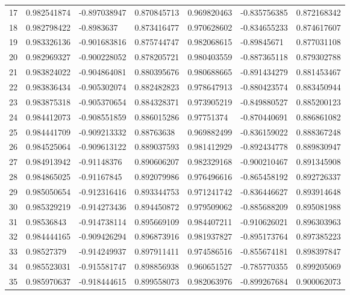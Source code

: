 \begin{table}[H]
{\begin{tabular}{@{}lllllll@{}}
        17 & 0.982541874 & -0.897038947 & 0.870845713 & 0.969820463 & -0.835756385 & 0.872168342 \\
        18 & 0.982798422 & -0.8983637 & 0.873416477 & 0.970628602 & -0.834655233 & 0.874617607 \\
        19 & 0.983326136 & -0.901683816 & 0.875744747 & 0.982068615 & -0.89845671 & 0.877031108 \\
        20 & 0.982969327 & -0.900228052 & 0.878205721 & 0.980403559 & -0.887365118 & 0.879302788 \\
        21 & 0.983824022 & -0.904864081 & 0.880395676 & 0.980688665 & -0.891434279 & 0.881453467 \\
        22 & 0.983836434 & -0.905302074 & 0.882482823 & 0.978647913 & -0.880423574 & 0.883450944 \\
        23 & 0.983875318 & -0.905370654 & 0.884328371 & 0.973905219 & -0.849880527 & 0.885200123 \\
        24 & 0.984412073 & -0.908551859 & 0.886015286 & 0.97751374 & -0.870440691 & 0.886861082 \\
        25 & 0.984441709 & -0.909213332 & 0.88763638 & 0.969882499 & -0.836159022 & 0.888367248 \\
        26 & 0.984525064 & -0.909613122 & 0.889037593 & 0.981412929 & -0.892434778 & 0.889830947 \\
        27 & 0.984913942 & -0.91148376 & 0.890606207 & 0.982329168 & -0.900210467 & 0.891345908 \\
        28 & 0.984865025 & -0.91167845 & 0.892079986 & 0.976496616 & -0.865458192 & 0.892726337 \\
        29 & 0.985050654 & -0.912316416 & 0.893344753 & 0.971241742 & -0.836446627 & 0.893914648 \\
        30 & 0.985329219 & -0.914273436 & 0.894450872 & 0.979509062 & -0.885688209 & 0.895081988 \\
        31 & 0.98536843 & -0.914738114 & 0.895669109 & 0.984407211 & -0.910626021 & 0.896303963 \\
        32 & 0.984444165 & -0.909426294 & 0.896873916 & 0.981937827 & -0.895173764 & 0.897385223 \\
        33 & 0.98527379 & -0.914249937 & 0.897911411 & 0.974586516 & -0.855674181 & 0.898397847 \\
        34 & 0.985523031 & -0.915581747 & 0.898856938 & 0.960651527 & -0.785770355 & 0.899205069 \\
        35 & 0.985970637 & -0.918444615 & 0.899558073 & 0.982063976 & -0.899267684 & 0.900062073 \\

\end{tabular}}
\end{table}
